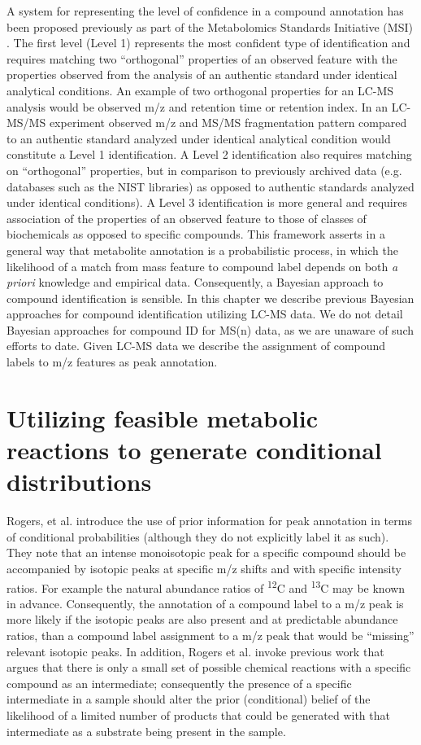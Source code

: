 \begin{DoubleSpace*}
A system for representing the level of confidence in a compound annotation has been proposed previously as part of the Metabolomics Standards Initiative (MSI) \cite{sumner2007}. The first level (Level 1) represents the most confident type of identification and requires matching two ``orthogonal'' properties of an observed feature with the properties observed from the analysis of an authentic standard under identical analytical conditions. An example of two orthogonal properties for an LC-MS analysis would be observed m/z and retention time or retention index. In an LC-MS/MS experiment observed m/z and MS/MS fragmentation pattern compared to an authentic standard analyzed under identical analytical condition would constitute a Level 1 identification.  A Level 2 identification also requires matching on ``orthogonal'' properties, but in comparison to previously archived data (e.g. databases such as the NIST libraries) as opposed to authentic standards analyzed under identical conditions). A Level 3 identification is more general and requires association of the properties of an observed feature to those of classes of biochemicals as opposed to specific compounds. This framework asserts in a general way that metabolite annotation is a probabilistic process, in which the likelihood of a match from mass feature to compound label depends on both \emph{a priori} knowledge and empirical data. Consequently, a Bayesian approach to compound identification is sensible. In this chapter we describe previous Bayesian approaches for compound identification utilizing LC-MS data. We do not detail Bayesian approaches for compound ID for MS(n) data, as we are unaware of such efforts to date. Given LC-MS data we describe the assignment of compound labels to m/z features as peak annotation. 

\section{Utilizing feasible metabolic reactions to generate conditional distributions}
Rogers, et al. \cite{rogers2009} introduce the use of prior information for peak annotation in terms of conditional probabilities (although they do not explicitly label it as such). They note that an intense monoisotopic peak for a specific compound should be accompanied by isotopic peaks at specific m/z shifts and with specific intensity ratios. For example the natural abundance ratios of \textsuperscript{12}C and \textsuperscript{13}C may be known in advance. Consequently, the annotation of a compound label to a m/z peak is more likely if the isotopic peaks are also present and at predictable abundance ratios, than a compound label assignment to a m/z peak that would be ``missing'' relevant isotopic peaks. In addition, Rogers et al. invoke previous work \cite{breitling2006} that argues that there is only a small set of possible chemical reactions with a specific compound as an intermediate; consequently the presence of a specific intermediate in a sample should alter the prior (conditional) belief of the likelihood of a limited number of products that could be generated with that intermediate as a substrate being present in the sample.


\end{DoubleSpace*}
